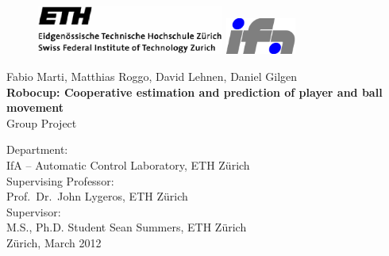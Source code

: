 \begin{titlepage}
	\begin{center}
	
	\begin{figure}[!ht]
	\begin{center}
	\centerline{ \includegraphics[height=16mm]{./Pictures/ethz_logo}
	              \hspace{25mm}
		    \includegraphics[height=12mm]{./Pictures/ifalogo_color}}
	\end{center}
	\end{figure}
	
	\vspace*{20mm}
	
	{Fabio Marti},
	{Matthias Roggo},
	{David Lehnen},
	{Daniel Gilgen}\\
	
	\vspace{10mm} {\LARGE \bf Robocup: Cooperative estimation and prediction of player and ball movement \\} \vspace{10mm}
	{Group Project} \\
	
	\vspace{50mm}
	
	Department: \\
	IfA -- Automatic Control Laboratory, ETH Z\"urich \\
	
	\vspace{5mm}
	Supervising Professor: \\
	Prof.~Dr.~John Lygeros, ETH Z\"urich \\
	
	\vspace{5mm}
	Supervisor: \\
	M.S., Ph.D. Student Sean Summers, ETH Z\"urich \\
	
	\vspace{10mm}
	Z\"urich, March 2012
	
	\end{center}
\end{titlepage}
